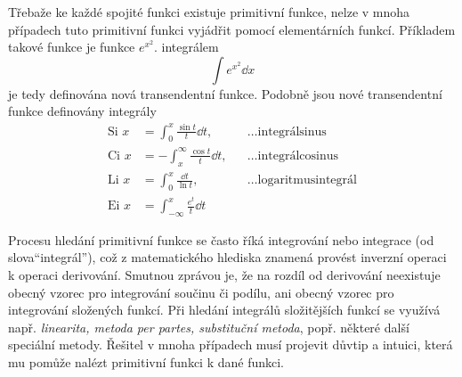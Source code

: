     \begin{mdframed}[style=mdnote]
      \begin{note}  
        Třebaže ke každé spojité funkci existuje primitivní funkce, nelze v mnoha případech tuto
        primitivní funkci vyjádřit pomocí elementárních funkcí. Příkladem takové funkce je funkce
        \(e^{x^2}\). integrálem
        \begin{equation*}
          \int e^{x^2}\dd{x}
        \end{equation*}
        je tedy definována nová transendentní funkce. Podobně jsou nové transendentní funkce
        definovány integrály
        \begin{align*}
          \text{Si }x &= \int_0^x     \frac{\sin t}{t}\dd{t},&&\ldots\text{integrálsinus}     \\
          \text{Ci }x &=-\int_x^\infty\frac{\cos t}{t}\dd{t},&&\ldots\text{integrálcosinus}   \\
          \text{Li }x &= \int_0^x     \frac{\dd{t}}{\ln t},  &&\ldots\text{logaritmusintegrál}\\
          \text{Ei }x &= \int_{-\infty}^x \frac{e^t}{t}\dd{t}&&   
        \end{align*}

      \end{note}
    \end{mdframed}

    Procesu hledání primitivní funkce se často říká integrování nebo integrace (od slova“integrál”),
    což z matematického hlediska znamená provést inverzní operaci k operaci derivování. Smutnou
    zprávou je, že na rozdíl od derivování neexistuje obecný vzorec pro integrování součinu či
    podílu, ani obecný vzorec pro integrování složených funkcí. Při hledání integrálů složitějších
    funkcí se využívá např. \emph{linearita, metoda per partes, substituční metoda}, popř. některé
    další speciální metody. Řešitel v mnoha případech musí projevit důvtip a intuici, která mu
    pomůže nalézt primitivní funkci k dané funkci.
  
